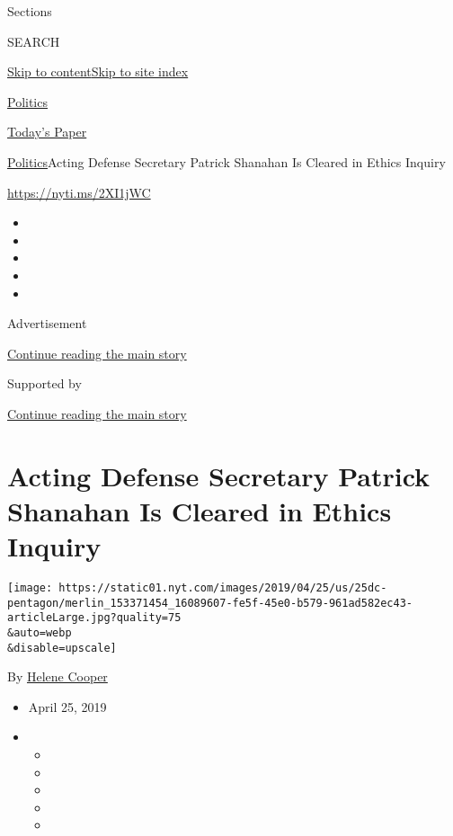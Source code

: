 Sections

SEARCH

\protect\hyperlink{site-content}{Skip to
content}\protect\hyperlink{site-index}{Skip to site index}

\href{https://www.nytimes.com/section/politics}{Politics}

\href{https://myaccount.nytimes.com/auth/login?response_type=cookie\&client_id=vi}{}

\href{https://www.nytimes.com/section/todayspaper}{Today's Paper}

\href{/section/politics}{Politics}\textbar{}Acting Defense Secretary
Patrick Shanahan Is Cleared in Ethics Inquiry

\url{https://nyti.ms/2XI1jWC}

\begin{itemize}
\item
\item
\item
\item
\item
\end{itemize}

Advertisement

\protect\hyperlink{after-top}{Continue reading the main story}

Supported by

\protect\hyperlink{after-sponsor}{Continue reading the main story}

\hypertarget{acting-defense-secretary-patrick-shanahan-is-cleared-in-ethics-inquiry}{%
\section{Acting Defense Secretary Patrick Shanahan Is Cleared in Ethics
Inquiry}\label{acting-defense-secretary-patrick-shanahan-is-cleared-in-ethics-inquiry}}

\texttt{[image: https://static01.nyt.com/images/2019/04/25/us/25dc-pentagon/merlin\_153371454\_16089607-fe5f-45e0-b579-961ad582ec43-articleLarge.jpg?quality=75\\\&auto=webp\\\&disable=upscale]}

By \href{https://www.nytimes.com/by/helene-cooper}{Helene Cooper}

\begin{itemize}
\item
  April 25, 2019
\item
  \begin{itemize}
  \item
  \item
  \item
  \item
  \item
  \end{itemize}
\end{itemize}

